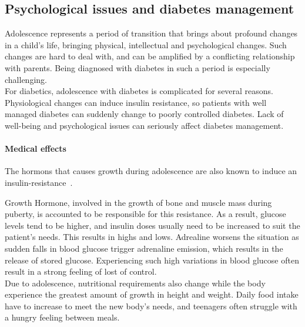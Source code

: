 \subsection{Psychological issues and diabetes management}

Adolescence represents a period of transition that brings about %
profound changes in a child's life, bringing physical, intellectual and psychological changes. Such changes are hard to deal with, and can be amplified by a conflicting relationship with parents. Being diagnosed with diabetes in such a period is especially challenging.
\\
For diabetics, adolescence with diabetes is complicated for several reasons. Physiological changes can induce insulin resistance, so patients with well managed diabetes can suddenly change to poorly controlled diabetes. Lack of well-being and psychological issues can seriously affect diabetes management. 
\\
\paragraph{Medical effects}
The hormons that causes growth during adolescence are also known to induce an insulin-resistance~\cite{HelpChildTeenTD1}.


Growth Hormone, involved in the growth of bone and muscle mass during puberty, is accounted to be responsible for this resistance. As a result, glucose levels tend to be higher, and insulin doses usually need to be increased to suit the patient's needs. 
This results in highs and lows. Adrealine worsens the situation as sudden falls in blood glucose trigger adrenaline emission, which results in the release of stored glucose. 
Experiencing such high variations in blood glucose often result in a strong feeling of lost of control.\\

Due to adolescence, nutritional requirements also change while the body experience the greatest amount of growth in height and weight. Daily food intake have to increase to meet the new body's needs, and teenagers often struggle with a hungry feeling between meals.  

